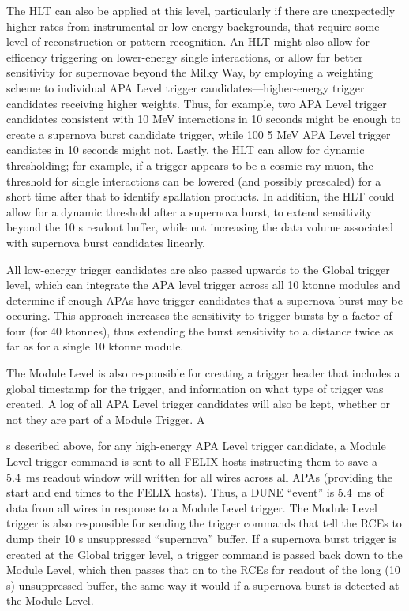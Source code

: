 	The HLT can also be applied at this level, particularly if there are
unexpectedly higher rates from instrumental or low-energy backgrounds, that
require some level of reconstruction or pattern recognition.  An HLT might also
allow for efficency triggering on lower-energy single interactions, or allow
for better sensitivity for supernovae beyond the Milky Way, by employing a
weighting scheme to individual APA Level trigger candidates---higher-energy
trigger candidates receiving higher weights. Thus, for example, two APA Level
trigger candidates consistent with 10 MeV interactions in 10 seconds might be
enough to create a supernova burst candidate trigger, while 100 5 MeV APA Level
trigger candiates in 10 seconds might not. Lastly, the HLT can allow for
dynamic thresholding; for example, if a trigger appears to be a cosmic-ray
muon, the threshold for single interactions can be lowered (and possibly
prescaled) for a short time after that to identify spallation products. In
addition, the HLT could allow for a dynamic threshold after a supernova burst,
to extend sensitivity beyond the 10 s readout buffer, while not increasing the
data volume associated with supernova burst candidates linearly. 

All low-energy trigger candidates are also passed upwards to the Global trigger
level, which can integrate the APA level trigger across all 10 ktonne modules
and determine if enough APAs have trigger candidates that a supernova burst may
be occuring. This approach increases the sensitivity to trigger bursts by a
factor of four (for 40 ktonnes), thus extending the burst sensitivity to a
distance twice as far as for a single 10 ktonne module. 

	The Module Level is also responsible for creating a trigger header that
includes a global timestamp for the trigger, and information on what type of
trigger was created. A log of all APA Level trigger candidates will also be
kept, whether or not they are part of a Module Trigger.  A

s described above, for any high-energy APA Level trigger candidate, a Module
Level trigger command is sent  to all FELIX hosts instructing them to save a
5.4~ms readout window will written for all wires across all APAs 
(providing the start and end times to the FELIX hosts).  Thus, a DUNE ``event''
is 5.4~ms of data from all wires in response to a Module Level trigger.  The
Module Level trigger is also responsible for sending the trigger commands that
tell the RCEs to dump their 10 s unsuppressed ``supernova'' buffer.  If a
supernova burst trigger is created at the Global trigger level, a trigger
command is passed back down to the Module Level, which then passes that on to
the RCEs for readout of the long (10 s) unsuppressed buffer, the same way it
would if a supernova burst is detected at the Module Level. 

